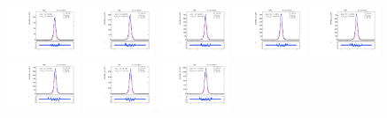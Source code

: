 \begin{figure}[htb]
\centering
\includegraphics[width=0.19\textwidth]{plots/Appendix_Recoil_Fits/ZmmData_PF_5TeV_2G_bkg/pfu1fit_0.pdf}
\includegraphics[width=0.19\textwidth]{plots/Appendix_Recoil_Fits/ZmmData_PF_5TeV_2G_bkg/pfu1fit_1.pdf}
\includegraphics[width=0.19\textwidth]{plots/Appendix_Recoil_Fits/ZmmData_PF_5TeV_2G_bkg/pfu1fit_2.pdf}
\includegraphics[width=0.19\textwidth]{plots/Appendix_Recoil_Fits/ZmmData_PF_5TeV_2G_bkg/pfu1fit_3.pdf}
\includegraphics[width=0.19\textwidth]{plots/Appendix_Recoil_Fits/ZmmData_PF_5TeV_2G_bkg/pfu1fit_4.pdf}
\includegraphics[width=0.19\textwidth]{plots/Appendix_Recoil_Fits/ZmmData_PF_5TeV_2G_bkg/pfu1fit_5.pdf}
\includegraphics[width=0.19\textwidth]{plots/Appendix_Recoil_Fits/ZmmData_PF_5TeV_2G_bkg/pfu1fit_6.pdf}
\includegraphics[width=0.19\textwidth]{plots/Appendix_Recoil_Fits/ZmmData_PF_5TeV_2G_bkg/pfu1fit_7.pdf}

\end{figure}
